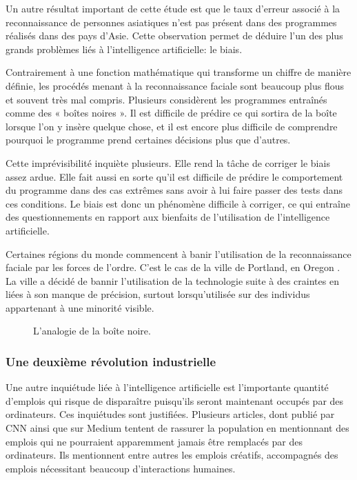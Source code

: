 \documentclass[letterpaper,10pt,french]{sphinxmanual}
\begin{document}
Un autre résultat important de cette étude est que le taux d’erreur associé à la
reconnaissance de personnes asiatiques n’est pas présent dans des programmes
réalisés dans des pays d’Asie. Cette observation permet de déduire l’un des plus
grands problèmes liés à l’intelligence artificielle: le biais.

Contrairement à une fonction mathématique qui transforme un chiffre de manière
définie, les procédés menant à la reconnaissance faciale sont beaucoup plus
flous et souvent très mal compris. Plusieurs considèrent les programmes
entraînés comme des « boîtes noires ». Il est difficile de prédire ce qui sortira
de la boîte lorsque l’on y insère quelque chose, et il est encore plus difficile
de comprendre pourquoi le programme prend certaines décisions plus que d’autres.

Cette imprévisibilité inquiète plusieurs. Elle rend la tâche de corriger le
biais assez ardue. Elle fait aussi en sorte qu’il est difficile de prédire le
comportement du programme dans des cas extrêmes sans avoir à lui faire passer
des tests dans ces conditions. Le biais est donc un phénomène difficile à
corriger, ce qui entraîne des questionnements en rapport aux bienfaits de
l’utilisation de l’intelligence artificielle.

Certaines régions du monde
commencent à banir l’utilisation de la reconnaissance faciale par les forces
de l’ordre. C’est le cas de la ville de Portland, en Oregon .
La ville a décidé de bannir l’utilisation de la technologie suite à des craintes
en liées à son manque de précision, surtout lorsqu’utilisée sur des individus
appartenant à une minorité visible.

\begin{figure}[htbp]
\centering
\capstart

\noindent{}
\caption{L’analogie de la boîte noire.}\label{\detokenize{enonce_sujet:boite-noire}}\end{figure}


\subsubsection{Une deuxième révolution industrielle}
\label{\detokenize{enonce_sujet:une-deuxieme-revolution-industrielle}}
Une autre inquiétude liée à l’intelligence artificielle est l’importante
quantité d’emplois qui risque de disparaître puisqu’ils seront maintenant
occupés par des ordinateurs. Ces inquiétudes sont justifiées. Plusieurs articles,
dont
publié par CNN ainsi que
sur Medium tentent de rassurer la population en mentionnant des emplois qui ne
pourraient apparemment jamais être remplacés par des ordinateurs. Ils mentionnent
entre autres les emplois créatifs, accompagnés des emplois nécessitant beaucoup
d’interactions humaines.
\end{document}
